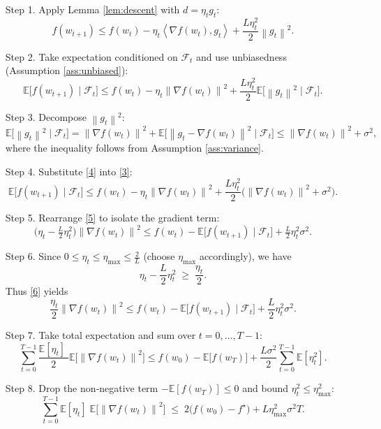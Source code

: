 \documentclass{article}
\newcommand{\EE}{\mathbb{E}}
\newcommand{\norm}[1]{\left\|#1\right\|}
\newcommand{\inner}[2]{\left\langle #1,#2\right\rangle}
\begin{document}
\begin{enumerate}
\item[Step 1.] Apply Lemma \ref{lem:descent} with $d=\eta_t g_t$:
\[
f(w_{t+1})\le f(w_t)-\eta_t\inner{\nabla f(w_t)}{g_t}+\frac{L\eta_t^{2}}{2}\norm{g_t}^{2}.
\tag{2}
\]

\item[Step 2.] Take expectation conditioned on $\mathcal{F}_t$ and use unbiasedness (Assumption \ref{ass:unbiased}):
\[
\EE\!\bigl[f(w_{t+1})\mid\mathcal{F}_t\bigr]
\le f(w_t)-\eta_t\norm{\nabla f(w_t)}^{2}
+\frac{L\eta_t^{2}}{2}\EE\!\bigl[\norm{g_t}^{2}\mid\mathcal{F}_t\bigr].
\tag{3}
\]

\item[Step 3.] Decompose $\norm{g_t}^{2}$:
\[
\EE\!\bigl[\norm{g_t}^{2}\mid\mathcal{F}_t\bigr]
= \norm{\nabla f(w_t)}^{2}
+ \EE\!\bigl[\norm{g_t-\nabla f(w_t)}^{2}\mid\mathcal{F}_t\bigr]
\le \norm{\nabla f(w_t)}^{2}+\sigma^{2},
\tag{4}
\]
where the inequality follows from Assumption \ref{ass:variance}.

\item[Step 4.] Substitute \eqref{4} into \eqref{3}:
\[
\EE\!\bigl[f(w_{t+1})\mid\mathcal{F}_t\bigr]
\le f(w_t)-\eta_t\norm{\nabla f(w_t)}^{2}
+\frac{L\eta_t^{2}}{2}\bigl(\norm{\nabla f(w_t)}^{2}+\sigma^{2}\bigr).
\tag{5}
\]

\item[Step 5.] Rearrange \eqref{5} to isolate the gradient term:
\[
\bigl(\eta_t-\tfrac{L}{2}\eta_t^{2}\bigr)\norm{\nabla f(w_t)}^{2}
\le f(w_t)-\EE\!\bigl[f(w_{t+1})\mid\mathcal{F}_t\bigr]
+\tfrac{L}{2}\eta_t^{2}\sigma^{2}.
\tag{6}
\]

\item[Step 6.] Since $0\le\eta_t\le\eta_{\max}\le \frac{2}{L}$ (choose $\eta_{\max}$ accordingly), we have
\[
\eta_t-\frac{L}{2}\eta_t^{2}\;\ge\;\frac{\eta_t}{2}.
\tag{7}
\]
Thus \eqref{6} yields
\[
\frac{\eta_t}{2}\norm{\nabla f(w_t)}^{2}
\le f(w_t)-\EE\!\bigl[f(w_{t+1})\mid\mathcal{F}_t\bigr]
+\frac{L}{2}\eta_t^{2}\sigma^{2}.
\tag{8}
\]

\item[Step 7.] Take total expectation and sum over $t=0,\dots,T-1$:
\[
\sum_{t=0}^{T-1}\frac{\EE[\eta_t]\;}{2}\EE\!\bigl[\norm{\nabla f(w_t)}^{2}\bigr]
\le f(w_0)-\EE\!\bigl[f(w_T)\bigr]
+\frac{L\sigma^{2}}{2}\sum_{t=0}^{T-1}\EE[\eta_t^{2}].
\tag{9}
\]

\item[Step 8.] Drop the non‑negative term $-\EE[f(w_T)]\le 0$ and bound $\eta_t^{2}\le\eta_{\max}^{2}$:
\[
\sum_{t=0}^{T-1}\EE[\eta_t]\;\EE\!\bigl[\norm{\nabla f(w_t)}^{2}\bigr]
\;\le\;
2\bigl(f(w_0)-f^{\star}\bigr)
+L\eta_{\max}^{2}\sigma^{2}T.
\tag{10}
\]


\end{enumerate}
\end{document}

